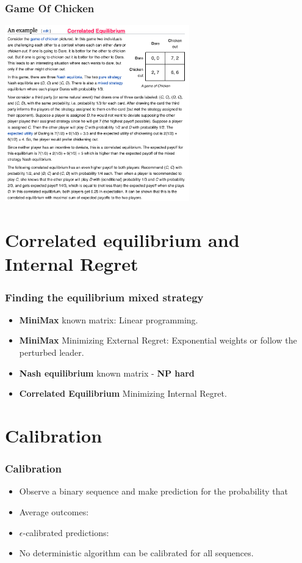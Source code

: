\documentclass[handout]{beamer}
\begin{document}
\begin{frame}
  \frametitle{Game Of Chicken}
  \includegraphics[width=8cm]{figures/CorrelatedEquilibrium.png}
\end{frame}

\section{Correlated equilibrium and Internal Regret}

\begin{frame}
  \frametitle{Finding the equilibrium mixed strategy}
  \begin{itemize}
  \item {\bf MiniMax} known matrix: Linear programming.
  \item {\bf MiniMax} Minimizing External Regret: Exponential weights or follow
    the perturbed leader.
  \item {\bf Nash equilibrium} known matrix - {\bf NP hard}
  \item {\bf Correlated Equilibrium} Minimizing Internal Regret.
  \end{itemize}
\end{frame}

\section{Calibration}
\begin{frame}
\frametitle{Calibration}
\begin{itemize}
\item Observe a binary sequence  and make
  prediction  for the probability that 
\item Average outcomes: 
\item $\epsilon$-calibrated predictions:
\item No deterministic algorithm can be calibrated for all sequences.
\end{itemize}
\end{frame}
\end{document}
